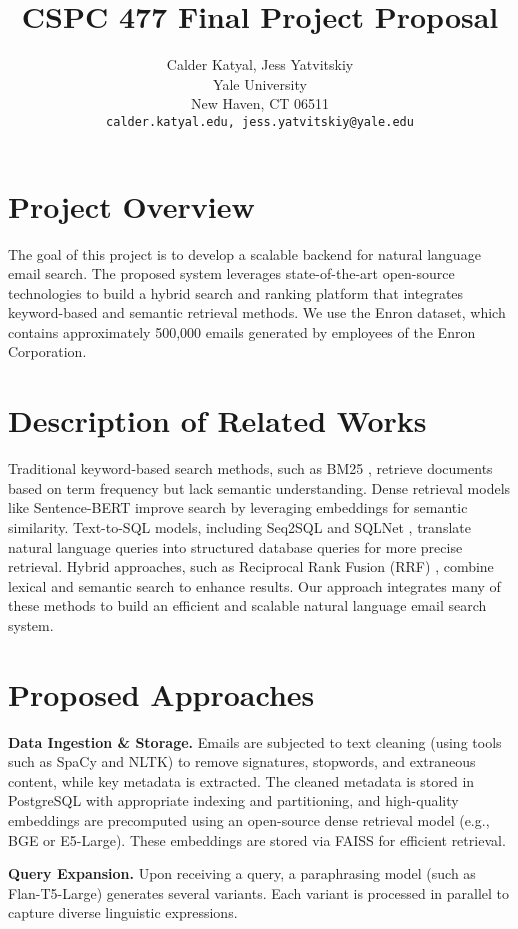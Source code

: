 \documentclass{article}
\title{CSPC 477 Final Project Proposal}
\author{%
  Calder Katyal, Jess Yatvitskiy\\
  Yale University\\
  New Haven, CT 06511 \\
  \texttt{calder.katyal.edu, jess.yatvitskiy@yale.edu} \\
}
\begin{document}
\maketitle
\vspace{-2em}
\section{Project Overview}
\label{project_overview}

The goal of this project is to develop a scalable backend for natural language email search. The proposed system leverages state-of-the-art open-source technologies to build a hybrid search and ranking platform that integrates keyword-based and semantic retrieval methods. We use the Enron dataset, which contains approximately 500,000 emails generated by employees of the Enron Corporation.
\section{Description of Related Works}
\label{related_works}
Traditional keyword-based search methods, such as BM25 \citep{bm25}, retrieve documents based on term frequency but lack semantic understanding. Dense retrieval models like Sentence-BERT \citep{sentencebert} improve search by leveraging embeddings for semantic similarity. Text-to-SQL models, including Seq2SQL \citep{seq2sql} and SQLNet \citep{sqlnet}, translate natural language queries into structured database queries for more precise retrieval. Hybrid approaches, such as Reciprocal Rank Fusion (RRF) \citep{rrf}, combine lexical and semantic search to enhance results. Our approach integrates many of these methods to build an efficient and scalable natural language email search system.
\section{Proposed Approaches}

\textbf{Data Ingestion \& Storage.} Emails are subjected to text cleaning (using tools such as SpaCy and NLTK) to remove signatures, stopwords, and extraneous content, while key metadata is extracted. The cleaned metadata is stored in PostgreSQL with appropriate indexing and partitioning, and high-quality embeddings are precomputed using an open-source dense retrieval model (e.g., BGE or E5-Large). These embeddings are stored via FAISS for efficient retrieval.

\textbf{Query Expansion.} Upon receiving a query, a paraphrasing model (such as Flan-T5-Large) generates several variants. Each variant is processed in parallel to capture diverse linguistic expressions.
\end{document}
